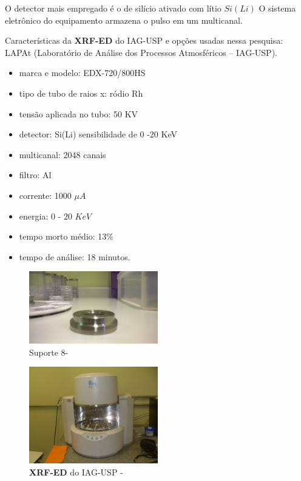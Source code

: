 O detector mais empregado é o de silício ativado com lítio $Si(Li)$ 
O sistema eletrônico do equipamento armazena o pulso em um multicanal.

Características da \textbf{XRF-ED} do IAG-USP e opções usadas nessa pesquisa:
LAPAt (Laboratório de Análise dos Processos Atmosféricos – IAG-USP).
\begin{itemize}
  \item marca e modelo: EDX-720/800HS
  \item tipo de tubo de raios x: ródio Rh
  \item tensão aplicada no tubo: 50 KV 
  \item detector: Si(Li) sensibilidade de 0 -20 KeV
  \item multicanal: 2048 canais
  \item filtro: Al
  \item corrente: 1000 $\mu A$
  \item energia: 0 - 20 $KeV$ 
  \item tempo morto médio: 13\%
  \item tempo de análise: 18 minutos.
\end{itemize}

\begin{figure}[H]
\begin{center}
  \includegraphics[width=0.5\textwidth]{../inputs/images/suporte8.jpg}
  \caption{Suporte 8- \label{fig:suporte8}}
\end{center}
\end{figure}

\begin{figure}[H]
\begin{center}
  \includegraphics[width=0.5\textwidth]{../inputs/images/xrf-ed-IAG-USP.jpg}
  \caption{\textbf{XRF-ED} do IAG-USP - \label{fig:xrfed_iag}}
\end{center}
\end{figure}

